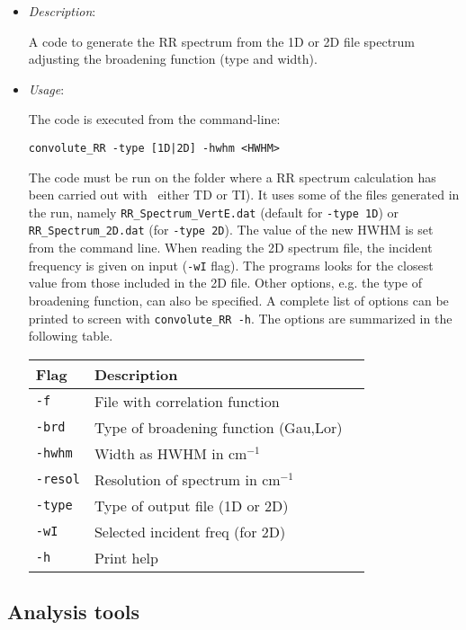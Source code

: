 \documentclass[a4paper,11pt]{article}
\begin{document}
\begin{itemize}
  \item[] \textit{Description}:

   A code to generate the RR spectrum from the 1D or 2D file spectrum adjusting the broadening function (type and width).

   \item[] \textit{Usage}:

   The code is executed from the command-line:

   \texttt{convolute\_RR -type [1D|2D] -hwhm <HWHM>}

   The code must be run on the folder where a RR spectrum calculation has been carried out with \fccIII\ either TD or TI). It uses some of the files generated in the run, namely \texttt{RR\_Spectrum\_VertE.dat} (default for \texttt{-type 1D}) or \texttt{RR\_Spectrum\_2D.dat} (for \texttt{-type 2D}). The value of the new HWHM is set from the command line. When reading the 2D spectrum file, the incident frequency is given on input (\texttt{-wI} flag). The programs looks for the closest value from those included in the 2D file. Other options, e.g. the type of broadening function, can also be specified. A complete list of options can be printed to screen with \texttt{convolute\_RR -h}. The options are summarized in the following table.

   \begin{tabular}{lll}
    Flag & Description  \\\hline
 \texttt{-f}    & File with correlation function    \\
 \texttt{-brd}  & Type of broadening function (Gau,Lor)            \\
 \texttt{-hwhm} & Width as HWHM in cm$^{-1}$  \\
 \texttt{-resol}& Resolution of spectrum in cm$^{-1}$  \\
 \texttt{-type} & Type of output file (1D or 2D)   \\
 \texttt{-wI}   & Selected incident freq (for 2D)     \\
 \texttt{-h}    & Print help\\ \hline
 \hline
   \end{tabular}

 \end{itemize}

\subsection{Analysis tools}
\end{document}
